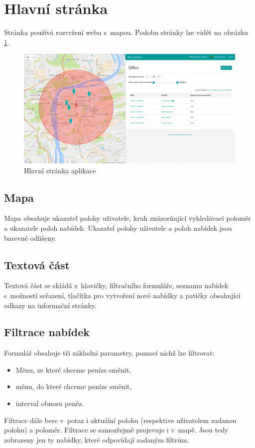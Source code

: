 \section{Hlavní stránka}

\label{nur:homepage}
Stránka používá rozvržení webu s~mapou. Podobu stránky lze vidět na obrázku \ref{fig:tur:homepage}.

\begin{figure}[!h]
    \centering
    \includegraphics[width=1.0\textwidth]{media/tur/homepage.png}
    \caption{Hlavní stránka aplikace}
    \label{fig:tur:homepage}
\end{figure}

\subsection{Mapa}
Mapa obsahuje ukazatel polohy uživatele, kruh znázorňující vyhledávací poloměr a ukazatele poloh nabídek. Ukazatel polohy uživatele a poloh nabídek jsou barevně odlišeny.

\subsection{Textová část}
Textová část se skládá z~hlavičky, filtračního formuláře, seznamu nabídek s~možností seřazení, tlačítka pro vytvoření nové nabídky a patičky obsahující odkazy na informační stránky.

\subsection{Filtrace nabídek}
Formulář obsahuje tři základní parametry, pomocí nichž lze filtrovat:
\begin{itemize}
	\item Měnu, ze které chceme peníze směnit,
	\item měnu, do které chceme peníze směnit,
	\item interval obnosu peněz.
\end{itemize}
Filtrace dále bere v~potaz i aktuální polohu (respektive uživatelem zadanou polohu) a poloměr. Filtrace se samozřejmě projevuje i v~mapě. Jsou tedy zobrazeny jen ty nabídky, které odpovídají zadaným filtrům.


